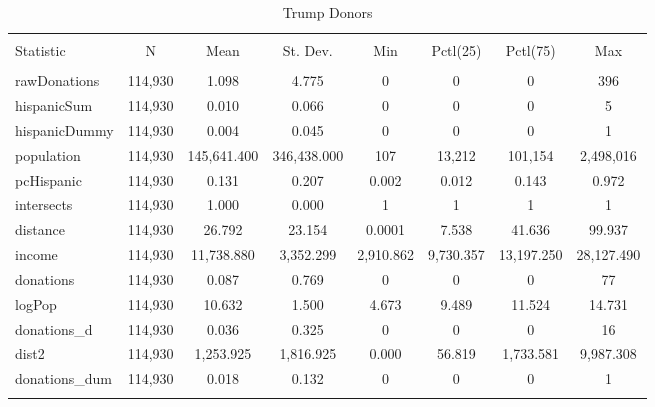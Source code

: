 \begin{table}[!htbp] \centering 
  \caption{Trump Donors} 
  \label{} 
\scriptsize 
\begin{tabular}{@{\extracolsep{5pt}}lccccccc} 
\\[-1.8ex]\hline 
\hline \\[-1.8ex] 
Statistic & \multicolumn{1}{c}{N} & \multicolumn{1}{c}{Mean} & \multicolumn{1}{c}{St. Dev.} & \multicolumn{1}{c}{Min} & \multicolumn{1}{c}{Pctl(25)} & \multicolumn{1}{c}{Pctl(75)} & \multicolumn{1}{c}{Max} \\ 
\hline \\[-1.8ex] 
rawDonations & 114,930 & 1.098 & 4.775 & 0 & 0 & 0 & 396 \\ 
hispanicSum & 114,930 & 0.010 & 0.066 & 0 & 0 & 0 & 5 \\ 
hispanicDummy & 114,930 & 0.004 & 0.045 & 0 & 0 & 0 & 1 \\ 
population & 114,930 & 145,641.400 & 346,438.000 & 107 & 13,212 & 101,154 & 2,498,016 \\ 
pcHispanic & 114,930 & 0.131 & 0.207 & 0.002 & 0.012 & 0.143 & 0.972 \\ 
intersects & 114,930 & 1.000 & 0.000 & 1 & 1 & 1 & 1 \\ 
distance & 114,930 & 26.792 & 23.154 & 0.0001 & 7.538 & 41.636 & 99.937 \\ 
income & 114,930 & 11,738.880 & 3,352.299 & 2,910.862 & 9,730.357 & 13,197.250 & 28,127.490 \\ 
donations & 114,930 & 0.087 & 0.769 & 0 & 0 & 0 & 77 \\ 
logPop & 114,930 & 10.632 & 1.500 & 4.673 & 9.489 & 11.524 & 14.731 \\ 
donations\_d & 114,930 & 0.036 & 0.325 & 0 & 0 & 0 & 16 \\ 
dist2 & 114,930 & 1,253.925 & 1,816.925 & 0.000 & 56.819 & 1,733.581 & 9,987.308 \\ 
donations\_dum & 114,930 & 0.018 & 0.132 & 0 & 0 & 0 & 1 \\ 
\hline \\[-1.8ex] 
\end{tabular} 
\end{table} 
